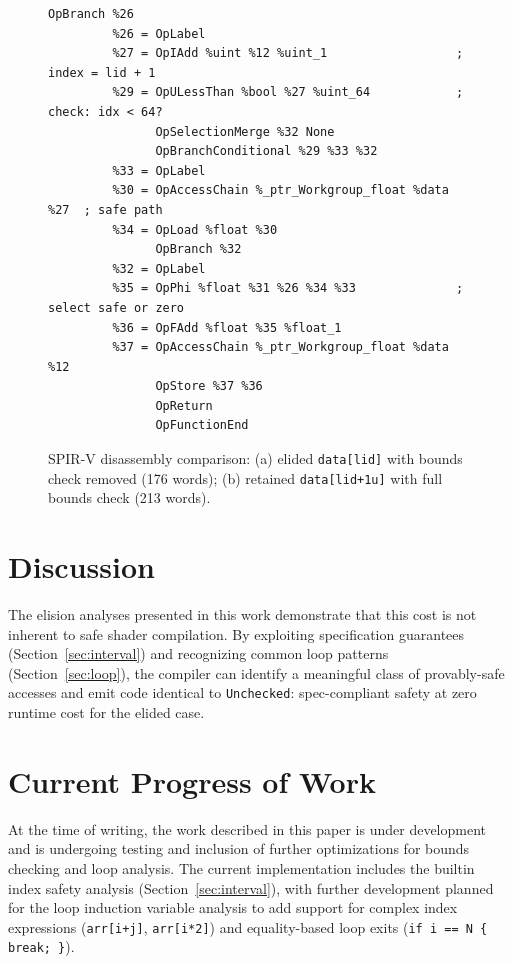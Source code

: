 \documentclass[11pt,a4paper]{article}
\begin{document}
\begin{figure}[h!]
\begin{lstlisting}[basicstyle=\ttfamily\tiny]
               OpBranch %26
         %26 = OpLabel
         %27 = OpIAdd %uint %12 %uint_1                  ; index = lid + 1
         %29 = OpULessThan %bool %27 %uint_64            ; check: idx < 64?
               OpSelectionMerge %32 None
               OpBranchConditional %29 %33 %32
         %33 = OpLabel
         %30 = OpAccessChain %_ptr_Workgroup_float %data %27  ; safe path
         %34 = OpLoad %float %30
               OpBranch %32
         %32 = OpLabel
         %35 = OpPhi %float %31 %26 %34 %33              ; select safe or zero
         %36 = OpFAdd %float %35 %float_1
         %37 = OpAccessChain %_ptr_Workgroup_float %data %12
               OpStore %37 %36
               OpReturn
               OpFunctionEnd
\end{lstlisting}
\caption{SPIR-V disassembly comparison: (a) elided \texttt{data[lid]} with
bounds check removed (176 words); (b) retained \texttt{data[lid+1u]} with
full bounds check (213 words).}
\label{fig:spv_combined}
\end{figure}

\clearpage
\section{Discussion}
\label{sec:discussion}

The elision analyses presented in this work demonstrate that this cost is not
inherent to safe shader compilation. By exploiting specification guarantees
(Section~\ref{sec:interval}) and recognizing common loop patterns
(Section~\ref{sec:loop}), the compiler can identify a meaningful class of
provably-safe accesses and emit code identical to
\texttt{Unchecked}: spec-compliant safety at zero runtime cost for the
elided case.

\section{Current Progress of Work}
\label{sec:future}

At the time of writing, the work described in this paper is under development
and is undergoing testing and inclusion of further optimizations for bounds
checking and loop analysis. The current implementation includes the builtin
index safety analysis (Section~\ref{sec:interval}), with further development
planned for the loop induction variable analysis to add support for complex
index expressions (\texttt{arr[i+j]}, \texttt{arr[i*2]}) and equality-based
loop exits (\texttt{if i == N \{ break; \}}).
\end{document}
